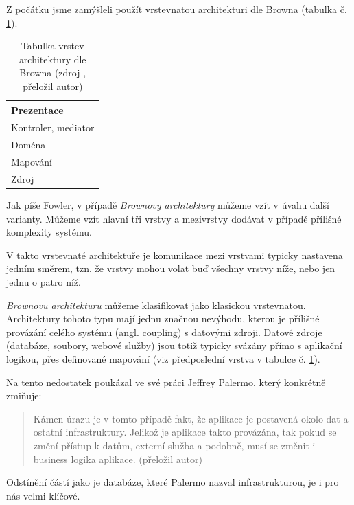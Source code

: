 Z počátku jsme zamýšleli použít vrstevnatou architekturi dle Browna (tabulka č. \ref{tab:brown}). 
\begin{table}[htbp!]
\begin{ctucolortab}
\begin{tabularx}{0.3\linewidth}{l}
                Prezentace \\ \hline
                Kontroler, mediator \\ \hline
                Doména \\ \hline
                Mapování \\ \hline
                Zdroj
\end{tabularx}
\end{ctucolortab}
	\caption{Tabulka vrstev architektury dle Browna (zdroj \cite{fowler-patterns}, přeložil autor)}
	\label{tab:brown}
\end{table}
Jak píše Fowler, v případě \textit{Brownovy architektury} můžeme vzít v úvahu další varianty. Můžeme vzít hlavní tři vrstvy a mezivrstvy dodávat v případě přílišné komplexity systému. \cite{fowler-patterns}\par
V takto vrstevnaté architektuře je komunikace mezi vrstvami typicky nastavena jedním směrem, tzn. že vrstvy mohou volat buď všechny vrstvy níže, nebo jen jednu o patro níž. 
\par
\textit{Brownovu architekturu} můžeme klasifikovat jako klasickou vrstevnatou. Architektury tohoto typu mají jednu značnou nevýhodu, kterou je přílišné provázání celého systému (angl. coupling) s datovými zdroji. Datové zdroje (databáze, soubory, webové služby) jsou totiž typicky svázány přímo s aplikační logikou, přes definované mapování (viz předposlední vrstva v tabulce č. \ref{tab:brown}).\par
\noindent Na tento nedostatek poukázal ve své práci Jeffrey Palermo, který konkrétně zmiňuje:
\begin{quote}
    Kámen úrazu je v tomto případě fakt, že aplikace je postavená okolo dat a ostatní infrastruktury. Jelikož je aplikace takto provázána, tak pokud se změní přístup k datům, externí služba a podobně, musí se změnit i business logika aplikace. \cite{palermo}  (přeložil autor)
\end{quote}
Odstínění částí jako je databáze, které Palermo nazval infrastrukturou, je i pro nás velmi klíčové.
